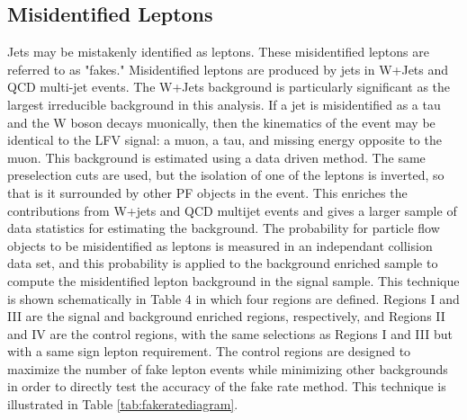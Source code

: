 \documentclass[oneside, letterpaper, oldfontcommands]{memoir}
\begin{document}
\subsection{Misidentified Leptons}\label{fakes}
\qquad Jets may be mistakenly identified as leptons. These misidentified leptons are referred to as "fakes." Misidentified leptons are produced by jets in W+Jets and QCD multi-jet events. The W+Jets background is particularly significant as the largest irreducible background in this analysis. If a jet is misidentified as a tau and the W boson decays muonically, then the kinematics of the event may be identical to the LFV signal: a muon, a tau, and missing energy opposite to the muon. This background is estimated using a data driven method. The same preselection cuts are used, but the isolation of one of the leptons is inverted, so that is it surrounded by other PF objects in the event. This enriches the contributions from W+jets and QCD multijet events and gives a larger sample of data statistics for estimating the background. The probability for particle flow objects to be misidentified as leptons is measured in an independant collision data set, and this probability is applied to the background enriched sample to compute the misidentified lepton background in the signal sample. This technique is shown schematically in Table 4 in which four regions are defined. Regions I and III are the signal and background enriched regions, respectively, and Regions II and IV are the control regions, with the same selections as Regions I and III but with a same sign lepton requirement. The control regions are designed to maximize the number of fake lepton events while minimizing other backgrounds in order to directly test the accuracy of the fake rate method. This technique is illustrated in Table \ref{tab:fakeratediagram}.
\end{document}
